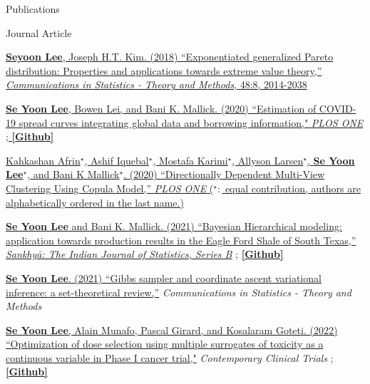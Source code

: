 \documentclass[
	11pt, %
]{resume} %
\begin{document}
\begin{rSection}{Publications}
\begin{rSubsection}{Journal Article}{}{}{}
\item[] [1] \href{https://www.tandfonline.com/doi/pdf/10.1080/03610926.2018.1441418?needAccess=true}
{\underline{\textbf{Seyoon Lee}}, Joseph H.T. Kim. (2018) ``Exponentiated generalized Pareto distribution:
Properties and applications towards extreme
value theory,''
\textit{Communications in Statistics - Theory and Methods},
 48:8, 2014-2038}
\item[] [2] \href{https://journals.plos.org/plosone/article?id=10.1371/journal.pone.0236860}
{\underline{\textbf{Se Yoon Lee}}, Bowen Lei, and Bani K. Mallick. (2020)
``Estimation of COVID-19 spread curves integrating global data and borrowing information," \textit{PLOS ONE}
;
\href{https://github.com/StevenBoys/BHRM}{\underline{\textbf{[Github]}}}
}
\item[] [3] 
\href{https://journals.plos.org/plosone/article?id=10.1371/journal.pone.0238996}
{Kahkashan Afrin$^\star$,  Ashif Iquebal$^\star$, Mostafa Karimi$^\star$, Allyson Larsen$^\star$, \underline{\textbf{Se Yoon Lee}}$^\star$, and Bani K Mallick$^\star$. (2020) ``Directionally Dependent Multi-View Clustering Using Copula Model,'' \textit{PLOS ONE} ($^\star:$ equal contribution, authors are alphabetically ordered in the last name.)}
\item[] [4]
\href{https://rdcu.be/ceg4p}
{\underline{\textbf{Se Yoon Lee}} and Bani K. Mallick. (2021)
``Bayesian Hierarchical modeling: application towards
production results in the Eagle Ford Shale of South Texas,'' \textit{Sankhyā: The Indian Journal of Statistics, Series B}}
;
\href{https://github.com/yain22/SWM}{\underline{\textbf{[Github]}}}
\item[] [5]
\href{https://www.tandfonline.com/doi/full/10.1080/03610926.2021.1921214?src=}
{\underline{\textbf{Se Yoon Lee}}. (2021)
``Gibbs sampler and coordinate ascent variational inference: a set-theoretical review,''}
\textit{Communications in Statistics - Theory and Methods}
\item[][6]
\href{https://www.sciencedirect.com/science/article/pii/S1551714421003931}
{\underline{\textbf{Se Yoon Lee}}, Alain Munafo, Pascal Girard, and Kosalaram Goteti. (2022)
``Optimization of dose selection using multiple surrogates of toxicity as a continuous variable in Phase I cancer trial,"}
\textit{Contemporary Clinical Trials} 
;
\href{https://github.com/yain22/2PLD}{\underline{\textbf{[Github]}}}

\end{rSubsection}
\end{rSection}
\end{document}
